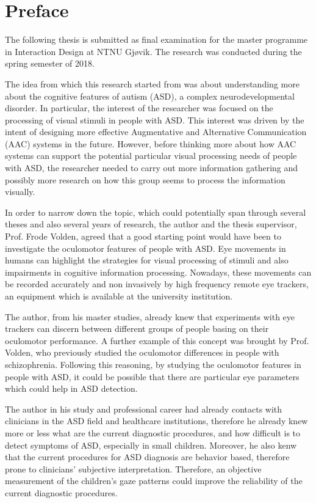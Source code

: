 \hypersetup{pageanchor=false}
%

\chapter*{Preface}
The following thesis is submitted as final examination for the master programme in Interaction Design at NTNU Gjøvik. The research was conducted during the spring semester of 2018.

The idea from which this research started from was about understanding more about the cognitive features of autism (ASD), a complex neurodevelopmental disorder. In particular, the interest of the researcher was focused on the processing of visual stimuli in people with ASD. This interest was driven by the intent of designing more effective Augmentative and Alternative Communication (AAC) systems in the future. However, before thinking more about how AAC systems can support the potential particular visual processing needs of people with ASD, the researcher needed to carry out more information gathering and possibly more research on how this group seems to process the information visually.

In order to narrow down the topic, which could potentially span through several theses and also several years of research, the author and the thesis supervisor, Prof. Frode Volden, agreed that a good starting point would have been to investigate the oculomotor features of people with ASD. Eye movements in humans can highlight the strategies for visual processing of stimuli and also impairments in cognitive information processing. Nowadays, these movements can be recorded accurately and non invasively by high frequency remote eye trackers, an equipment which is available at the university institution.

The author, from his master studies, already knew that experiments with eye trackers can discern between different groups of people basing on their oculomotor performance. A further example of this concept was brought by Prof. Volden, who previously studied the oculomotor differences in people with schizophrenia. Following this reasoning, by studying the oculomotor features in people with ASD, it could be possible that there are particular eye parameters which could help in ASD detection.

The author in his study and professional career had already contacts with clinicians in the ASD field and healthcare institutions, therefore he already knew more or less what are the current diagnostic procedures, and how difficult is to detect symptoms of ASD, especially in small children. Moreover, he also kenw that the current procedures for ASD diagnosis are behavior based, therefore prone to clinicians' subjective interpretation. Therefore, an objective measurement of the children's gaze patterns could improve the reliability of the current diagnostic procedures.

